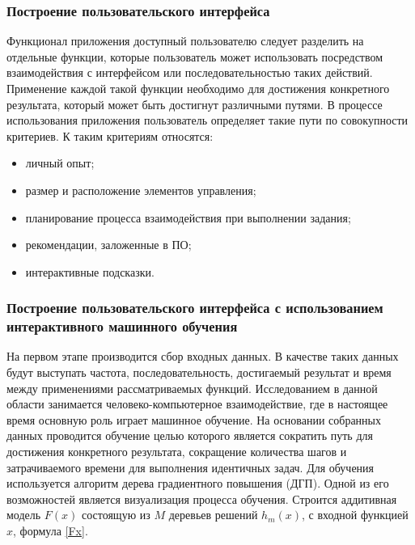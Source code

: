 \def\notedate{2022.10.13}
\def\currentauthor{Василян А.Р. (РК6-73Б)}

\subsubsection{Построение пользовательского интерфейса}
	Функционал приложения доступный пользователю следует разделить на отдельные функции, которые пользователь может использовать посредством взаимодействия с интерфейсом или последовательностью таких действий. Применение каждой такой функции необходимо для достижения конкретного результата, который может быть достигнут различными путями. В процессе использования приложения пользователь определяет такие пути по совокупности критериев. К таким критериям относятся:

\begin{itemize}
	\item личный опыт; 
	\item размер и расположение элементов управления;
	\item планирование процесса взаимодействия при выполнении задания;
	\item рекомендации, заложенные в ПО; 
	\item интерактивные подсказки.
\end{itemize}

\subsubsection{Построение пользовательского интерфейса с использованием интерактивного машинного обучения}
	На первом этапе производится сбор входных данных. В качестве таких данных будут выступать частота, последовательность, достигаемый результат и время между применениями рассматриваемых функций. Исследованием в данной области занимается человеко-компьютерное взаимодействие, где в настоящее время основную роль играет машинное обучение.
	На основании собранных данных проводится обучение целью которого является сократить путь для достижения конкретного результата, сокращение количества шагов и затрачиваемого времени для выполнения идентичных задач. Для обучения используется алгоритм дерева градиентного повышения (ДГП). Одной из его возможностей является визуализация процесса обучения. Строится аддитивная модель $F(x)$ состоящую из $M$ деревьев решений $h_m(x)$, с входной функцией $x$, формула  \ref{Fx}.

